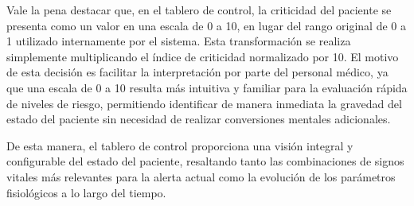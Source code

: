 Vale la pena destacar que, en el tablero de control, la criticidad del paciente se presenta como un valor en una escala de 0 a 10, en lugar del rango original de 0 a 1 utilizado internamente por el sistema. Esta transformación se realiza simplemente multiplicando el índice de criticidad normalizado por 10. El motivo de esta decisión es facilitar la interpretación por parte del personal médico, ya que una escala de 0 a 10 resulta más intuitiva y familiar para la evaluación rápida de niveles de riesgo, permitiendo identificar de manera inmediata la gravedad del estado del paciente sin necesidad de realizar conversiones mentales adicionales.

De esta manera, el tablero de control proporciona una visión integral y configurable del estado del paciente, resaltando tanto las combinaciones de signos vitales más relevantes para la alerta actual como la evolución de los parámetros fisiológicos a lo largo del tiempo.

